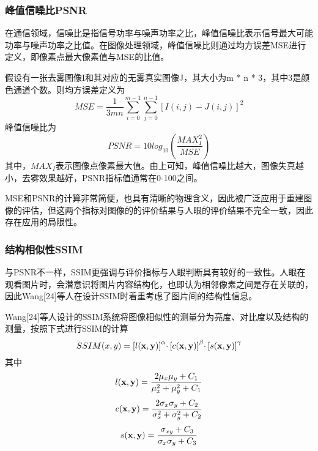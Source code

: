 \documentclass[a4paper, 12pt]{report}
\begin{document}
\subsubsection{峰值信噪比PSNR}

在通信领域，信噪比是指信号功率与噪声功率之比，峰值信噪比表示信号最大可能功率与噪声功率之比值。在图像处理领域，峰值信噪比则通过均方误差MSE进行定义，即像素点最大像素值与MSE的比值。

假设有一张去雾图像I和其对应的无雾真实图像J，其大小为m * n * 3，其中3是颜色通道个数。则均方误差定义为
\begin{equation}
MSE = \frac{1}{3mn}\sum_{i = 0}^{m - 1}\sum_{j = 0}^{n - 1}{[I(i, j) - J(i, j)] }^2
\end{equation}
峰值信噪比为
\begin{equation}
PSNR = 10 log_{10}(\frac{MAX_I^2}{MSE})
\end{equation}
其中，$MAX_I$表示图像点像素最大值。由上可知，峰值信噪比越大，图像失真越小，去雾效果越好，PSNR指标值通常在0-100之间。
	
MSE和PSNR的计算非常简便，也具有清晰的物理含义，因此被广泛应用于重建图像的评估，但这两个指标对图像的的评价结果与人眼的评价结果不完全一致，因此存在应用的局限性。

\subsubsection{结构相似性SSIM}
与PSNR不一样，SSIM更强调与评价指标与人眼判断具有较好的一致性。人眼在观看图片时，会潜意识将图片内容结构化，也即认为相邻像素之间是存在关联的，因此Wang[24]等人在设计SSIM时着重考虑了图片间的结构性信息。
	
Wang[24]等人设计的SSIM系统将图像相似性的测量分为亮度、对比度以及结构的测量，按照下式进行SSIM的计算
\begin{equation}
SSIM(x, y) = {[l{\bf (x, y)}]}^{\alpha}\cdotp {[c{\bf (x, y)}]}^{\beta}\cdotp {[s{\bf (x, y)}]}^{\gamma} 
\end{equation}
其中
\begin{equation}
l{\bf (x, y)} = \frac{2\mu_x\mu_y + C_1}{\mu_x^2 + \mu_y^2 + C_1}
\end{equation}
\begin{equation}
c{\bf (x, y)} = \frac{2\sigma_x\sigma_y + C_2}{\sigma_x^2 + \sigma_y^2 + C_2}
\end{equation}
\begin{equation}
s{\bf (x, y)} = \frac{\sigma_{xy}+ C_3}{\sigma_x\sigma_y + C_3}
\end{equation}
\end{document}
